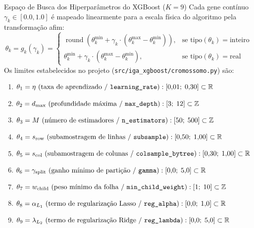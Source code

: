 \documentclass[11pt,a4paper]{article}
\begin{document}
\begin{mathBox}{Espaço de Busca dos Hiperparâmetros do XGBoost ($K=9$)}
Cada gene contínuo $\gamma_k \in [0.0, 1.0]$ é mapeado linearmente para a escala física do algoritmo pela transformação afim:
\begin{equation}
  \theta_k = g_k(\gamma_k) = \begin{cases}
    \operatorname{round}\left( \theta_k^{\min} + \gamma_k \cdot (\theta_k^{\max} - \theta_k^{\min}) \right), & \text{se } \text{tipo}(\theta_k) = \text{inteiro} \\
    \theta_k^{\min} + \gamma_k \cdot (\theta_k^{\max} - \theta_k^{\min}), & \text{se } \text{tipo}(\theta_k) = \text{real}
  \end{cases}
  \label{eq:mapeamento_afim}
\end{equation}
Os limites estabelecidos no projeto (\texttt{src/iga\_xgboost/cromossomo.py}) são:
\begin{enumerate}
  \item $\theta_1 = \eta \text{ (taxa de aprendizado / \texttt{learning\_rate})}: [0{,}01; \; 0{,}30] \subset \mathbb{R}$
  \item $\theta_2 = d_{\max} \text{ (profundidade máxima / \texttt{max\_depth})}: [3; \; 12] \subset \mathbb{Z}$
  \item $\theta_3 = M \text{ (número de estimadores / \texttt{n\_estimators})}: [50; \; 500] \subset \mathbb{Z}$
  \item $\theta_4 = s_{\text{row}} \text{ (subamostragem de linhas / \texttt{subsample})}: [0{,}50; \; 1{,}00] \subset \mathbb{R}$
  \item $\theta_5 = s_{\text{col}} \text{ (subamostragem de colunas / \texttt{colsample\_bytree})}: [0{,}30; \; 1{,}00] \subset \mathbb{R}$
  \item $\theta_6 = \gamma_{\text{split}} \text{ (ganho mínimo de partição / \texttt{gamma})}: [0{,}0; \; 5{,}0] \subset \mathbb{R}$
  \item $\theta_7 = w_{\text{child}} \text{ (peso mínimo da folha / \texttt{min\_child\_weight})}: [1; \; 10] \subset \mathbb{Z}$
  \item $\theta_8 = \alpha_{L_1} \text{ (termo de regularização Lasso / \texttt{reg\_alpha})}: [0{,}0; \; 1{,}0] \subset \mathbb{R}$
  \item $\theta_9 = \lambda_{L_2} \text{ (termo de regularização Ridge / \texttt{reg\_lambda})}: [0{,}0; \; 5{,}0] \subset \mathbb{R}$
\end{enumerate}
\end{mathBox}
\end{document}
